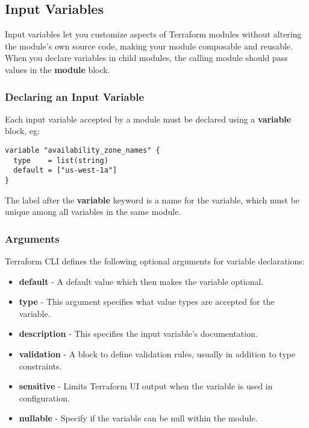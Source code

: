 \documentclass[12pt, letterpaper, twoside]{article}
\begin{document}
\subsection{Input Variables}
Input variables let you customize aspects of Terraform modules without altering the 
module's own source code, making your module composable and reusable.\\

When you declare variables in child modules, the calling module should pass values 
in the \textbf{module} block.\\

\subsubsection{Declaring an Input Variable}
Each input variable accepted by a module must be declared using a \textbf{variable} block, eg:\\

\begin{verbatim}
variable "availability_zone_names" {
  type    = list(string)
  default = ["us-west-1a"]
}
\end{verbatim}

The label after the \textbf{variable} keyword is a name for the variable, which must be unique among 
all variables in the same module.

\subsubsection{Arguments}
Terraform CLI defines the following optional arguments for variable declarations:

\begin{itemize}
    \item\textbf{default} - A default value which then makes the variable optional.
    \item\textbf{type} - This argument specifies what value types are accepted for the variable.
    \item\textbf{description} - This specifies the input variable's documentation.
	\item\textbf{validation} - A block to define validation rules, usually in addition to type constraints.
    \item\textbf{sensitive} - Limits Terraform UI output when the variable is used in configuration.
    \item\textbf{nullable} - Specify if the variable can be null within the module.
\end{itemize}
\end{document}
